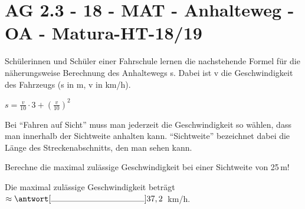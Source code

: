 \section{AG 2.3 - 18 - MAT - Anhalteweg - OA - Matura-HT-18/19}

\begin{beispiel}[AG 2.3]{1}
Schülerinnen und Schüler einer Fahrschule lernen die nachstehende Formel für die näherungsweise Berechnung des Anhaltewegs s. Dabei ist v die Geschwindigkeit des Fahrzeugs (s in m, v in km/h).

$s=\frac{v}{10}\cdot 3 + \left(\frac{v}{10}\right)^2$

Bei "`Fahren auf Sicht"' muss man jederzeit die Geschwindigkeit so wählen, dass man innerhalb
der Sichtweite anhalten kann. "`Sichtweite"' bezeichnet dabei die Länge des Streckenabschnitts,
den man sehen kann.\leer

Berechne die maximal zulässige Geschwindigkeit bei einer Sichtweite von 25\,m!


Die maximal zulässige Geschwindigkeit beträgt $\approx \antwort[\rule{4cm}{0.3pt}]{37,2}$\, km/h.


\end{beispiel}